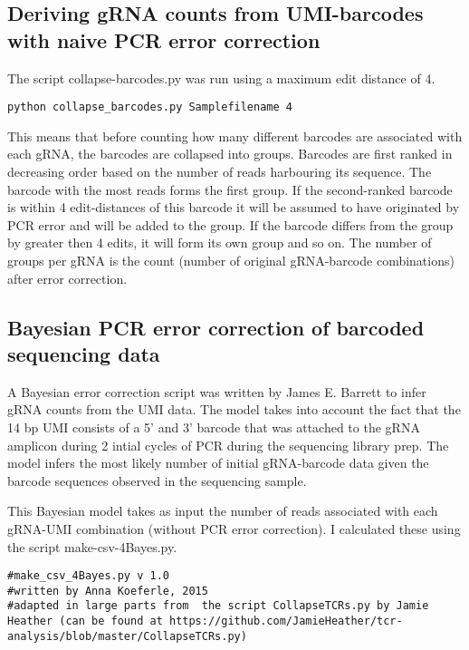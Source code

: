 \begin{footnotesize}
\subsection{Deriving gRNA counts from UMI-barcodes with naive PCR error correction}

The script collapse-barcodes.py was run using a maximum edit distance of 4. 

\begin{lstlisting}
python collapse_barcodes.py Samplefilename 4
\end{lstlisting}

This means that before counting how many different barcodes are associated with each gRNA, the barcodes are collapsed into groups. Barcodes are first ranked in decreasing order based on the number of reads harbouring its sequence. The barcode with the most reads forms the first group. If the second-ranked barcode is within 4 edit-distances of this barcode it will be assumed to have originated by PCR error and will be added to the group. If the barcode differs from the group by greater then 4 edits, it will form its own group and so on.
The number of groups per gRNA is the count (number of original gRNA-barcode combinations) after error correction.


\subsection{Bayesian PCR error correction of barcoded sequencing data }

A Bayesian error correction script was written by James E. Barrett to infer gRNA counts from the UMI data. The model takes into account the fact that the 14 bp UMI consists of a 5' and 3' barcode that was attached to the gRNA amplicon during 2 intial cycles of PCR during the sequencing library prep. The model infers the most likely number of initial gRNA-barcode data given the barcode sequences observed in the sequencing sample.

This Bayesian model takes as input the number of reads associated with each gRNA-UMI combination (without PCR error correction). I calculated these using the script make-csv-4Bayes.py. 


\begin{lstlisting}
#make_csv_4Bayes.py v 1.0
#written by Anna Koeferle, 2015
#adapted in large parts from  the script CollapseTCRs.py by Jamie Heather (can be found at https://github.com/JamieHeather/tcr-analysis/blob/master/CollapseTCRs.py)


\end{lstlisting}
\end{footnotesize}
